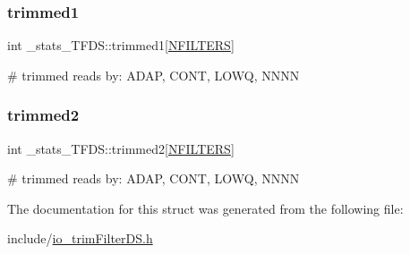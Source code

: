\subsubsection{\texorpdfstring{trimmed1}{trimmed1}}
{\footnotesize\ttfamily int \+\_\+stats\+\_\+\+T\+F\+D\+S\+::trimmed1\mbox{[}\mbox{\hyperlink{defines_8h_a23f1103d8247781ab0be4b0fba2f085f}{N\+F\+I\+L\+T\+E\+RS}}\mbox{]}}

\# trimmed reads by\+: A\+D\+AP, C\+O\+NT, L\+O\+WQ, N\+N\+NN \mbox{\label{struct__stats__TFDS_ac83a1c0eb87d51443fe75ce235047af8}} 
\subsubsection{\texorpdfstring{trimmed2}{trimmed2}}
{\footnotesize\ttfamily int \+\_\+stats\+\_\+\+T\+F\+D\+S\+::trimmed2\mbox{[}\mbox{\hyperlink{defines_8h_a23f1103d8247781ab0be4b0fba2f085f}{N\+F\+I\+L\+T\+E\+RS}}\mbox{]}}

\# trimmed reads by\+: A\+D\+AP, C\+O\+NT, L\+O\+WQ, N\+N\+NN 

The documentation for this struct was generated from the following file\+:\begin{DoxyCompactItemize}
\item 
include/\mbox{\hyperlink{io__trimFilterDS_8h}{io\+\_\+trim\+Filter\+D\+S.\+h}}\end{DoxyCompactItemize}
